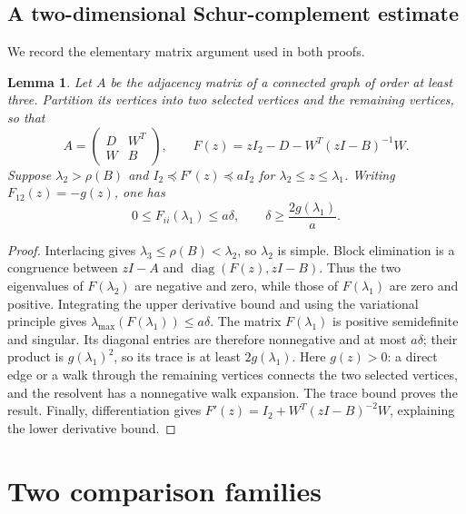 \documentclass[11pt,a4paper]{article}
\numberwithin{equation}{section}
\newtheorem{lemma}[theorem]{Lemma}
\theoremstyle{definition}
\theoremstyle{remark}
\begin{document}
\subsection{A two-dimensional Schur-complement estimate}
We record the elementary matrix argument used in both proofs.
\begin{lemma}\label{pre:schur}
Let $A$ be the adjacency matrix of a connected graph of order at least
three. Partition its
vertices into two selected vertices and the remaining vertices, so that
\[
 A=\begin{pmatrix}D&W^T\\ W&B\end{pmatrix},\qquad
 F(z)=zI_2-D-W^T(zI-B)^{-1}W.
\]
Suppose $\lambda_2>\rho(B)$ and
$I_2\preceq F'(z)\preceq aI_2$ for $\lambda_2\le z\le\lambda_1$.
Writing $F_{12}(z)=-g(z)$, one has
\[
 0\le F_{ii}(\lambda_1)\le a\delta,
 \qquad \delta\ge\frac{2g(\lambda_1)}a.
\]
\end{lemma}
\begin{proof}
Interlacing gives $\lambda_3\le\rho(B)<\lambda_2$, so $\lambda_2$
is simple. Block elimination is a congruence between $zI-A$ and
$\operatorname{diag}(F(z),zI-B)$. Thus the two eigenvalues of
$F(\lambda_2)$ are negative and zero, while those of $F(\lambda_1)$
are zero and positive. Integrating the upper derivative bound and using
the variational principle gives
$\lambda_{\max}(F(\lambda_1))\le a\delta$.
The matrix $F(\lambda_1)$ is positive semidefinite and singular.
Its diagonal entries are therefore nonnegative and at most $a\delta$;
their product is $g(\lambda_1)^2$, so its trace is at least
$2g(\lambda_1)$. Here $g(z)>0$: a direct edge or a walk through the
remaining vertices connects the two selected vertices, and the resolvent
has a nonnegative walk expansion. The trace bound proves the result.
Finally, differentiation gives
$F'(z)=I_2+W^T(zI-B)^{-2}W$, explaining the lower derivative bound.
\end{proof}

\section{Two comparison families}\label{sec:benchmarks}
\end{document}
